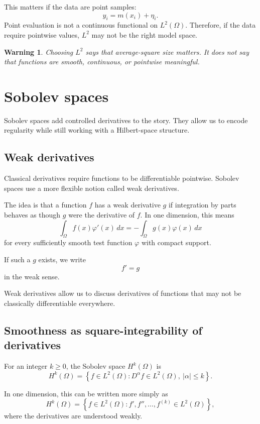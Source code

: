 \documentclass[11pt,a4paper]{book}
\newtheorem{warning}[definition]{Warning}
\begin{document}
This matters if the data are point samples:
\[
    y_i = m(x_i)+\eta_i.
\]
Point evaluation is not a continuous functional on $L^2(\Omega)$. Therefore,
if the data require pointwise values, $L^2$ may not be the right model space.

\begin{warning}
Choosing $L^2$ says that average-square size matters. It does not say that
functions are smooth, continuous, or pointwise meaningful.
\end{warning}

\section{Sobolev spaces}

Sobolev spaces add controlled derivatives to the story. They allow us to encode
regularity while still working with a Hilbert-space structure.

\subsection{Weak derivatives}

Classical derivatives require functions to be differentiable pointwise. Sobolev
spaces use a more flexible notion called weak derivatives.

The idea is that a function $f$ has a weak derivative $g$ if integration by
parts behaves as though $g$ were the derivative of $f$. In one dimension, this
means
\[
    \int_\Omega f(x)\varphi'(x)\,dx
    =
    -
    \int_\Omega g(x)\varphi(x)\,dx
\]
for every sufficiently smooth test function $\varphi$ with compact support.

If such a $g$ exists, we write
\[
    f' = g
\]
in the weak sense.

Weak derivatives allow us to discuss derivatives of functions that may not be
classically differentiable everywhere.

\subsection{Smoothness as square-integrability of derivatives}

For an integer $k\geq 0$, the Sobolev space $H^k(\Omega)$ is
\[
    H^k(\Omega)
    =
    \left\{
        f \in L^2(\Omega)
        :
        D^\alpha f \in L^2(\Omega),
        \ |\alpha|\leq k
    \right\}.
\]

In one dimension, this can be written more simply as
\[
    H^k(\Omega)
    =
    \left\{
        f\in L^2(\Omega)
        :
        f',f'',\ldots,f^{(k)}\in L^2(\Omega)
    \right\},
\]
where the derivatives are understood weakly.
\end{document}
